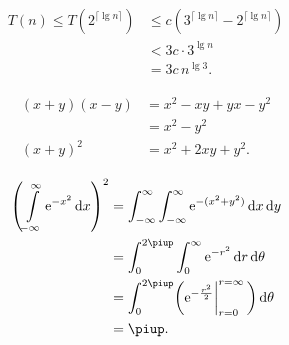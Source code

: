 \documentclass[11pt, a4paper, oneside]{article}
\newcommand{\mathup}[1]{\mathrm{#1}}
\theoremstyle{Plain}
\theoremstyle{Definition}
\theoremstyle{Remark}
\begin{document}
\begin{appendix}

	\begin{align*}
	T(n)\le T(2^{\lceil\lg n\rceil})
	&\le c(3^{\lceil\lg n\rceil}-2^{\lceil\lg n\rceil})\\
	&<3c\cdot3^{\lg n}\\
	&=3c\,n^{\lg3}.
	\end{align*}



	\begin{align*}
	\begin{aligned}
	(x+y)(x-y)&=x^2-xy+yx-y^2\\
	&=x^2-y^2\\
	(x+y)^2&=x^2+2xy+y^2.
	\end{aligned}
	\end{align*}


	\begin{align*}
	\begin{aligned}
	\left( \int\limits_{-\infty}^\infty \mathup{e}^{-x^2}\,\mathup{d}x \right)^2
	&=\int_{-\infty}^\infty\int_{-\infty}^\infty \mathup{e}^{-(x^2+y^2)}\,\mathup{d}x\,\mathup{d}y\\
	&=\int_0^{2\piup}\int_0^\infty \mathup{e}^{-r^2}\,\mathup{d}r\,\mathup{d}\theta\\
	&=\int_0^{2\piup}\biggl(\mathup{e}^{-\frac{r^2}{2}}\biggl|_{r=0}^{r=\infty}\,\biggr)\,\mathup{d}\theta\\
	&=\piup.
	\end{aligned}
	\end{align*}


\end{appendix}
\end{document}
